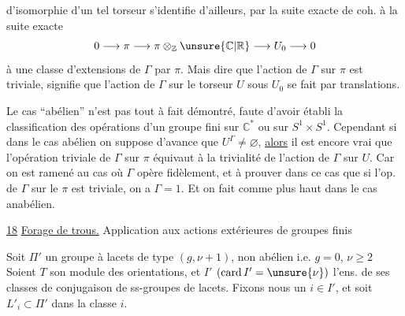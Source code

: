 
d'isomorphie d'un tel torseur s'identifie d'ailleurs, par la suite exacte de coh.  à la suite exacte
\[
0 \longrightarrow \pi \longrightarrow
\pi\otimes_{\mathbb Z}\unsure{\mathbb C|\mathbb R}
\longrightarrow U_0 \longrightarrow 0
\]
à une classe d'extensions de \(\Gamma\) par \(\pi\).
Mais dire que l'action de \(\Gamma\) sur \(\pi\) est triviale, signifie que l'action de \(\Gamma\) sur le torseur \(U\) sous \(U_0\) se fait par translations.

\uline{} Le cas ``abélien'' n'est pas tout à fait démontré, faute d'avoir établi la  classification  des opérations d'un groupe fini sur \(\mathbb C^{*}\) ou sur \(S^1\times S^1\). Cependant si dans le cas abélien on suppose d'avance que \(U^\Gamma\ne\varnothing\), \uline{alors}  il est encore vrai que l'opération triviale de \(\Gamma\) sur \(\pi\) équivaut à la trivialité de l'action de \(\Gamma\) sur \(U\). Car on est ramené au cas où \(\Gamma\) opère fidèlement, et à prouver dans ce cas que si l'op. de \(\Gamma\) sur le \(\pi\) est triviale, on a \(\Gamma=1\). Et on fait comme plus haut dans le cas anabélien.


\uline{18} \uline{Forage de trous.} Application aux actions extérieures de groupes finis

Soit \(\Pi'\) un groupe à lacets de type \((g,\nu+1)\), non abélien i.e.   \(g=0\),  \(\nu\ge2\)
Soient \(T\) son module des orientations, et \(I'\) \((\operatorname{card}I'=\unsure{\nu})\) l'ens. de ses classes de conjugaison de ss-groupes de lacets. Fixons nous un \(i\in I'\), et soit \(L'_i\subset\Pi'\) dans la classe \(i\).

